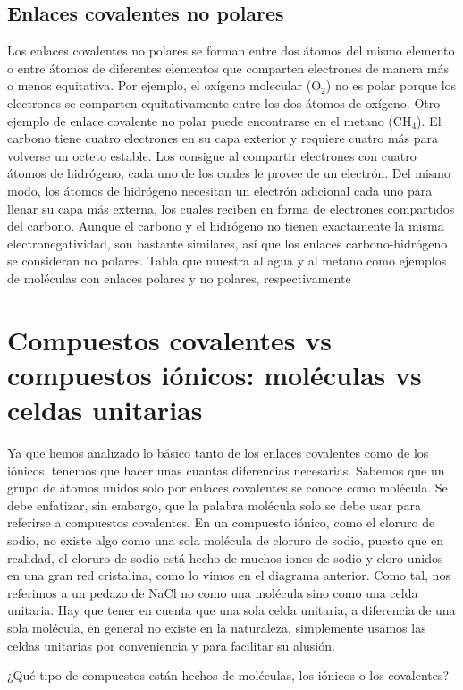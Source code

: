 \documentclass[12pt]{guia}
\begin{document}
\begin{questions}
    \subsection{Enlaces covalentes no polares}
    Los enlaces covalentes no polares se forman entre dos átomos del mismo elemento o entre átomos de diferentes elementos que comparten electrones de manera más o menos equitativa. Por ejemplo, el oxígeno molecular (O$_2$) no es polar porque los electrones se comparten equitativamente entre los dos átomos de oxígeno.
    Otro ejemplo de enlace covalente no polar puede encontrarse en el metano (CH$_4$). El carbono tiene cuatro electrones en su capa exterior y requiere cuatro más para volverse un octeto estable. Los consigue al compartir electrones con cuatro átomos de hidrógeno, cada uno de los cuales le provee de un electrón. Del mismo modo, los átomos de hidrógeno necesitan un electrón adicional cada uno para llenar su capa más externa, los cuales reciben en forma de electrones compartidos del carbono. Aunque el carbono y el hidrógeno no tienen exactamente la misma electronegatividad, son bastante similares, así que los enlaces carbono-hidrógeno se consideran no polares.
    Tabla que muestra al agua y al metano como ejemplos de moléculas con enlaces polares y no polares, respectivamente


    \section{Compuestos covalentes vs compuestos iónicos: moléculas vs celdas unitarias}
    Ya que hemos analizado lo básico tanto de los enlaces covalentes como de los iónicos, tenemos que hacer unas cuantas diferencias necesarias. Sabemos que un grupo de átomos unidos solo por enlaces covalentes se conoce como molécula. Se debe enfatizar, sin embargo, que la palabra molécula solo se debe usar para referirse a compuestos covalentes. En un compuesto iónico, como el cloruro de sodio, no existe algo como una sola molécula de cloruro de sodio, puesto que en realidad, el cloruro de sodio está hecho de muchos iones de sodio y cloro unidos en una gran red cristalina, como lo vimos en el diagrama anterior. Como tal, nos referimos a un pedazo de NaCl no como una molécula sino como una celda unitaria. Hay que tener en cuenta que una sola celda unitaria, a diferencia de una sola molécula, en general no existe en la naturaleza, simplemente usamos las celdas unitarias por conveniencia y para facilitar su alusión.

    \question[10] ¿Qué tipo de compuestos están hechos de moléculas, los iónicos o los covalentes?


\end{questions}
\end{document}
